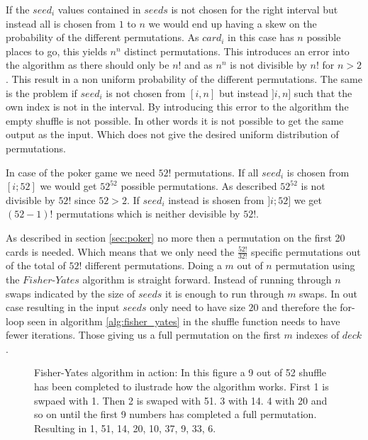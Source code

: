 \documentclass[twoside,11pt,openright]{report}
\begin{document}
If the $seed_i$ values contained in $seeds$ is not chosen for the right interval but instead all is chosen from $1$ to $n$ we would end up having a skew on the probability of the different permutations. As $card_i$ in this case has $n$ possible places to go, this yields $n^n$ distinct permutations. This introduces an error into the algorithm as there should only be $n!$ and as $n^n$ is not divisible by $n!$ for $n>2$. This result in a non uniform probability of the different permutations. The same is the problem if $seed_i$ is not chosen from $[i,n]$ but instead $]i,n]$ such that the own index is not in the interval. By introducing this error to the algorithm the empty shuffle is not possible. In other words it is not possible to get the same output as the input. Which does not give the desired uniform distribution of permutations.

\bigskip

In case of the poker game we need $52!$ permutations. If all $seed_i$ is chosen from $[i;52]$ we would get $52^{52}$ possible permutations. As described $52^{52}$ is not divisible by $52!$ since $52>2$. If $seed_i$ instead is shosen from $]i;52]$ we get $(52-1)!$ permutations which is neither devisible by $52!$.

\bigskip

As described in section \ref{sec:poker} no more then a permutation on the first 20 cards is needed. Which means that we only need the $\frac{52!}{32!}$ specific permutations out of the total of $52!$ different permutations. Doing a $m$ out of $n$ permutation using the $Fisher\text{-}Yates$ algorithm is straight forward. Instead of running through $n$ swaps indicated by the size of $seeds$ it is enough to run through $m$ swaps. In out case resulting in the input $seeds$ only need to have size $20$ and therefore the for-loop seen in algorithm \ref{alg:fisher_yates} in the shuffle function needs to have fewer iterations. Those giving us a full permutation on the first $m$ indexes of $deck$.

\bigskip

\begin{figure}
\centering
\scalebox{1.5}{}
\caption{Fisher-Yates algorithm in action: In this figure a 9 out of 52 shuffle has been completed to ilustrade how the algorithm works. First 1 is swpaed with 1. Then 2 is swaped with 51. 3 with 14. 4 with 20 and so on until the first 9 numbers has completed a full permutation. Resulting in 1, 51, 14, 20, 10, 37, 9, 33, 6.}
\label{fig:fisher_yates}
\end{figure}
\end{document}
